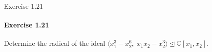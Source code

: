 \documentclass[12pt]{article}
\newenvironment{fullbox}{\begin{lrbox}{\savefullbox}\begin{minipage}{\dimexpr\textwidth-2\fboxsep\relax}}{\end{minipage}\end{lrbox}\begin{center}\framebox[\textwidth]{\usebox{\savefullbox}}\end{center}}
\newenvironment{pbox}[1][]{\begin{fullbox}\ifx#1\empty\else\paragraph{#1}\fi}{\end{fullbox}}
\theoremstyle{definition}
\newcommand{\C}{\mathbb{C}}
\newcommand{\<}{\langle}
\renewcommand{\>}{\rangle}
\newcommand{\teq}{\trianglelefteq}
\begin{document}
\begin{comment}
\end{proof}




\begin{pbox}[Exercise 1.20]
    Let $X$ be an affine variety.  Show that the coordinate ring $A(X)$ is a field if and only if $X$ is a single point.
\end{pbox}

\begin{proof}
    Suppose $X = \{a\}$, then we have the maximal ideal $J = \<x_1 - a_1, \dots, x_n - a_n\> \teq K[x_1, \dots, x_n]$. And since each polynomial of $J$ is zero on $X$, then $J \subseteq I(X)$. Then any ideal $J' \teq K[x_1, \dots, x_n]$ containing $I(X)$ must also contain $J$. And since $J$ is maximal then either $J' = K[x_1, \dots, x_n]$ or $J' = J$, and in the latter case, $J \subseteq I(X) \subseteq J'$ implies that $J = (X) = J'$. Hence, $I(X)$ is a maximal ideal.
    
    Now suppose the coordinate ring
    \[
        A(X) = K[x_1, \dots, x_n]/I(X)
    \]
    is a field. Since $A(X)$ can be regarded as the ring of polynomial functions on $X$, then the zero of $A(X)$ is the polynomial function which is zero on $X$, or, in other words, the equivalence class of functions in $K[x_1, \dots, x_n]$ which are zero on $X$. So a nonzero element of $A(X)$ is a polynomial of $K[x_1, \dots, x_n]$ which is nonzero at some point of $X$ (strictly speaking it would be an equivalence class of such polynomials agreeing on $X$). 
    
    Suppose we have $a \in X$, and consider the polynomial functions on $X$ given by $g_i = x_i - a_i$ for $i = 1, \dots, n$. We can see that $g_i(a) = 0$. And for any function $f \in A(X)$, we have
    \[
        (g_if)(a) = g_i(a)f(a) = 0f(a) = 0 \ne 1.
    \]
    In particular, this means that $g_i$ is not a unit in $A(X)$, since we would need $g_i g_i^{-1} = 1$ on all of $X$. Therefore, since $A(X)$ is a field, we must have $g_i = 0$ on $X$, which implies that $x_i = a_i$ for all $x \in X$. Since this is true for $i = 1, \dots, n$, then we must have $x = a$ for all $x \in X$, so in fact $X = \{a\}$.

\end{proof}

\end{comment}


\newpage

\begin{pbox}[Exercise 1.21]
    Determine the radical of the ideal $\<x_1^3 - x_2^6,\; x_1x_2 - x_2^3\> \teq \C[x_1, x_2]$.
\end{pbox}
\end{document}
